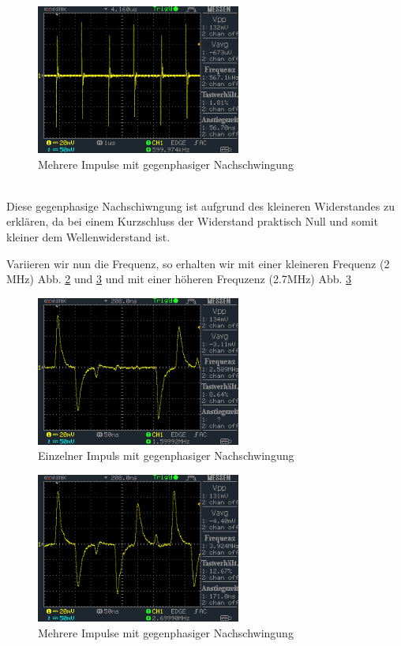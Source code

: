 \documentclass[a4paper,10pt]{article}
\numberwithin{equation}{section}
\begin{document}
\begin{figure}[h]
        \centering
        \includegraphics[width=0.6\textwidth]{data/DS0022.BMP.png}
        \caption{Mehrere Impulse mit gegenphasiger Nachschwingung}
		\label{fig:3.7}
\end{figure}\\
Diese gegenphasige Nachschiwngung ist aufgrund des kleineren Widerstandes zu erklären, da bei einem Kurzschluss der Widerstand praktisch Null und somit kleiner dem Wellenwiderstand ist. 

Variieren wir nun die Frequenz, so erhalten wir mit einer kleineren Frequenz (2 MHz) Abb. \ref{fig:3.8} und \ref{fig:3.9} und mit einer höheren Frequzenz (2.7MHz) Abb. \ref{fig:3.9}
\begin{figure}[h]
        \centering
        \includegraphics[width=0.6\textwidth]{data/DS0024.BMP.png}
        \caption{Einzelner Impuls mit gegenphasiger Nachschwingung}
		\label{fig:3.8}
\end{figure}
\begin{figure}[h]
        \centering
        \includegraphics[width=0.6\textwidth]{data/DS0025.BMP.png}
        \caption{Mehrere Impulse mit gegenphasiger Nachschwingung}
		\label{fig:3.9}
\end{figure}
\end{document}
